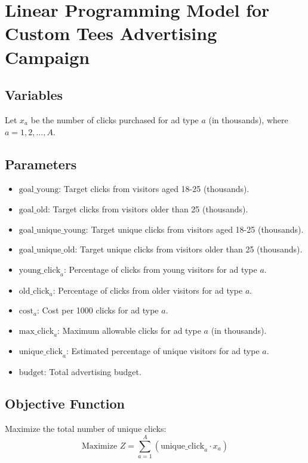 \documentclass{article}
\begin{document}
\section*{Linear Programming Model for Custom Tees Advertising Campaign}

\subsection*{Variables}
Let \( x_a \) be the number of clicks purchased for ad type \( a \) (in thousands), where \( a = 1, 2, \ldots, A \).

\subsection*{Parameters}
\begin{itemize}
    \item \( \text{goal\_young} \): Target clicks from visitors aged 18-25 (thousands).
    \item \( \text{goal\_old} \): Target clicks from visitors older than 25 (thousands).
    \item \( \text{goal\_unique\_young} \): Target unique clicks from visitors aged 18-25 (thousands).
    \item \( \text{goal\_unique\_old} \): Target unique clicks from visitors older than 25 (thousands).
    \item \( \text{young\_click}_a \): Percentage of clicks from young visitors for ad type \( a \).
    \item \( \text{old\_click}_a \): Percentage of clicks from older visitors for ad type \( a \).
    \item \( \text{cost}_a \): Cost per 1000 clicks for ad type \( a \).
    \item \( \text{max\_click}_a \): Maximum allowable clicks for ad type \( a \) (in thousands).
    \item \( \text{unique\_click}_a \): Estimated percentage of unique visitors for ad type \( a \).
    \item \( \text{budget} \): Total advertising budget.
\end{itemize}

\subsection*{Objective Function}
Maximize the total number of unique clicks:
\[
\text{Maximize } Z = \sum_{a=1}^{A} \left( \text{unique\_click}_a \cdot x_a \right)
\]
\end{document}
